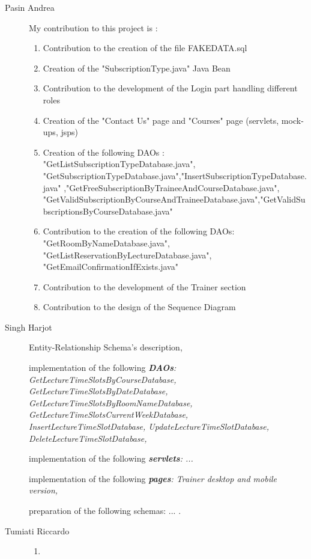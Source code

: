 \begin{description}
	\item[Pasin Andrea] My contribution to this project is :
	\begin{enumerate}
		\item Contribution to the creation of the file FAKE\textunderscore DATA.sql 
		\item Creation of the "SubscriptionType.java" Java Bean
		\item Contribution to the development of the Login part handling different roles
		\item Creation of the "Contact Us" page and "Courses" page (servlets, mock-ups, jsps)
		\item Creation of the following DAOs : "GetListSubscriptionTypeDatabase.java", "GetSubscriptionTypeDatabase.java","InsertSubscriptionTypeDatabase.java" ,"GetFreeSubscriptionByTraineeAndCourseDatabase.java", "GetValidSubscriptionByCourseAndTraineeDatabase.java","GetValidSubscriptionsByCourseDatabase.java"
		\item Contribution to the creation of the following DAOs: "GetRoomByNameDatabase.java", "GetListReservationByLectureDatabase.java", "GetEmailConfirmationIfExists.java"
		\item Contribution to the development of the Trainer section
		\item Contribution to the design of the Sequence Diagram
	\end{enumerate}
	\item[Singh Harjot] Entity-Relationship Schema's description,
	
	implementation of the following \textit{\textbf{DAOs}:
		GetLectureTimeSlotsByCourseDatabase,
		GetLectureTimeSlotsByDateDatabase,
		GetLectureTimeSlotsByRoomNameDatabase,
		GetLectureTimeSlotsCurrentWeekDatabase,
		InsertLectureTimeSlotDatabase,
		UpdateLectureTimeSlotDatabase,
		DeleteLectureTimeSlotDatabase,
	}
	
	implementation of the following \textit{\textbf{servlets}: 
		... 
	}
	
	implementation of the following \textit{\textbf{pages}: 
		Trainer desktop and mobile version,
	}
	
	preparation of the following schemas: ... .
	\item[Tumiati Riccardo] 
	\begin{enumerate}
		\item 
	\end{enumerate}
\end{description}